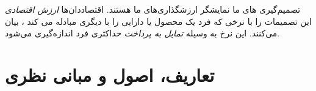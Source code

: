 \ifExperimentalAuction
	تصمیم‌گیری های ما نمایشگر ارزشگذاری‌های ما هستند. اقتصاد‌دان‌ها
	\textit{ارزش اقتصادی}
	این تصمیمات را با نرخی که فرد یک محصول یا دارایی را با  دیگری مبادله می کند ، بیان می‌کنند.
	این نرخ به وسیله
	\textit{تمایل به پرداخت }
	حداکثری فرد اندازه‌گیری می‌شود.
	\citep{luskExperimentalAuctionsMethods2007}
	\section{تعاریف، اصول و مبانی نظری}

\fi

